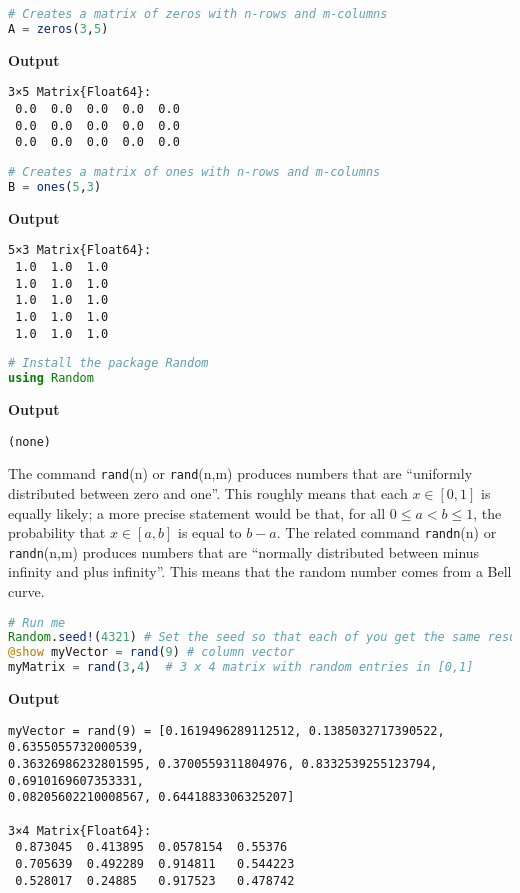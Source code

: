 \begin{lstlisting}[language=Julia,style=mystyle]
# Creates a matrix of zeros with n-rows and m-columns
A = zeros(3,5)
\end{lstlisting}
\textbf{Output} 
\begin{verbatim}
3×5 Matrix{Float64}:
 0.0  0.0  0.0  0.0  0.0
 0.0  0.0  0.0  0.0  0.0
 0.0  0.0  0.0  0.0  0.0
\end{verbatim}


\begin{lstlisting}[language=Julia,style=mystyle]
# Creates a matrix of ones with n-rows and m-columns
B = ones(5,3)
\end{lstlisting}
\textbf{Output} 
\begin{verbatim}
5×3 Matrix{Float64}:
 1.0  1.0  1.0
 1.0  1.0  1.0
 1.0  1.0  1.0
 1.0  1.0  1.0
 1.0  1.0  1.0
\end{verbatim}

\begin{lstlisting}[language=Julia,style=mystyle]
# Install the package Random
using Random
\end{lstlisting}
\textbf{Output} 
\begin{verbatim}
(none)
\end{verbatim}

The command \texttt{rand}(n) or \texttt{rand}(n,m) produces numbers that are ``uniformly distributed between zero and one''. This roughly means that each $x \in [0, 1]$ is equally likely; a more precise statement would be that, for all $0\le a < b \le 1$, the probability that $x \in [a, b]$ is equal to $b-a$. The related command \texttt{randn}(n) or \texttt{randn}(n,m) produces numbers that are ``normally distributed between minus infinity and plus infinity''. This means that the random number comes from a Bell curve. 

\begin{lstlisting}[language=Julia,style=mystyle]
# Run me
Random.seed!(4321) # Set the seed so that each of you get the same results. 
@show myVector = rand(9) # column vector
myMatrix = rand(3,4)  # 3 x 4 matrix with random entries in [0,1]
\end{lstlisting}
\textbf{Output} 
\begin{verbatim}
myVector = rand(9) = [0.1619496289112512, 0.1385032717390522, 0.6355055732000539,
0.36326986232801595, 0.3700559311804976, 0.8332539255123794, 0.6910169607353331,
0.08205602210008567, 0.6441883306325207]

3×4 Matrix{Float64}:
 0.873045  0.413895  0.0578154  0.55376
 0.705639  0.492289  0.914811   0.544223
 0.528017  0.24885   0.917523   0.478742
\end{verbatim}


